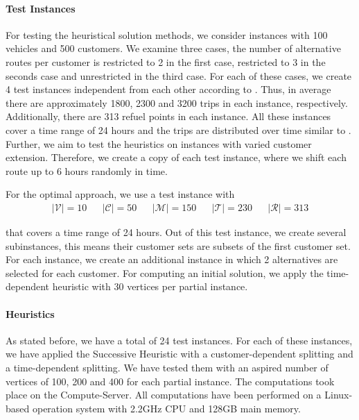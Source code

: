 \paragraph{Test Instances} \parfill

For testing the heuristical solution methods, we consider instances with 100 vehicles and 500 customers. We examine three cases, the number of alternative routes per customer is restricted to 2 in the first case, restricted to 3 in the seconds case and unrestricted in the third case. For each of these cases, we create 4 test instances independent from each other according to . Thus, in average there are approximately 1800, 2300 and 3200 trips in each instance, respectively. Additionally, there are 313 refuel points in each instance. All these instances cover a time range of 24 hours and the trips are distributed over time similar to . Further, we aim to test the heuristics on instances with varied customer extension. Therefore, we create a copy of each test instance, where we shift each route up to 6 hours randomly in time.

For the optimal approach, we use a test instance with
\begin{align*}
	\vert\mathcal{V}\vert = 10 && \vert\mathcal{C}\vert = 50 && \vert\mathcal{M}\vert = 150 && \vert\mathcal{T}\vert = 230 && \vert\mathcal{R}\vert = 313
\end{align*}

that covers a time range of 24 hours. Out of this test instance, we create several subinstances, this means their customer sets are subsets of the first customer set. For each instance, we create an additional instance in which 2 alternatives are selected for each customer. For computing an initial solution, we apply the time-dependent heuristic with 30 vertices per partial instance.

\paragraph{Heuristics} \parfill

As stated before, we have a total of 24 test instances. For each of these instances, we have applied the Successive Heuristic with a customer-dependent splitting and a time-dependent splitting. We have tested them with an aspired number of vertices of 100, 200 and 400 for each partial instance. The computations took place on the Compute-Server. All computations have been performed on a Linux-based operation system with 2.2GHz CPU and 128GB main memory.

